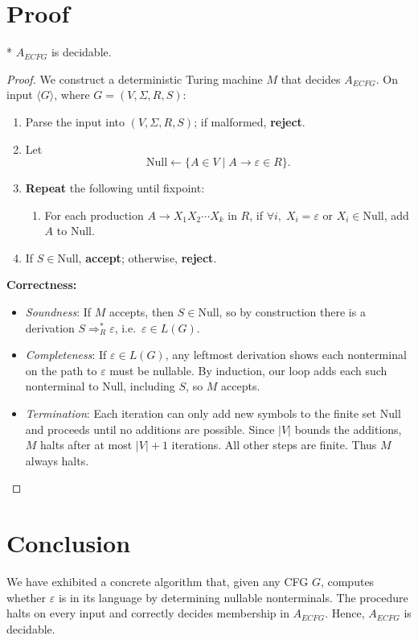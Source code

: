\documentclass[12pt]{article}
\begin{document}
	\section*{Proof}
	*	$A_{ECFG}$ is decidable.
	\begin{proof}
		We construct a deterministic Turing machine $M$ that decides $A_{ECFG}$.  On input $\langle G\rangle$, where $G=(V,\Sigma,R,S)$:
		\begin{enumerate}[label=\arabic*.]
			\item Parse the input into $(V,\Sigma,R,S)$; if malformed, \textbf{reject}.
			\item Let
			\[
			\mathrm{Null} \leftarrow \{A\in V \mid A\to\varepsilon\in R\}.
			\]
			\item \textbf{Repeat} the following until fixpoint:
			\begin{enumerate}[label=\alph*.]
				\item For each production $A\to X_1X_2\cdots X_k$ in $R$, if $\forall i,\;X_i=\varepsilon$ or $X_i\in\mathrm{Null}$, add $A$ to $\mathrm{Null}$.
			\end{enumerate}
			\item If $S\in\mathrm{Null}$, \textbf{accept}; otherwise, \textbf{reject}.
		\end{enumerate}
		
		\textbf{Correctness:}
		\begin{itemize}
			\item \emph{Soundness}: If $M$ accepts, then $S\in\mathrm{Null}$, so by construction there is a derivation $S\Rightarrow^*_R\varepsilon$, i.e.\ $\varepsilon\in L(G)$.
			\item \emph{Completeness}: If $\varepsilon\in L(G)$, any leftmost derivation shows each nonterminal on the path to $\varepsilon$ must be nullable.  By induction, our loop adds each such nonterminal to $\mathrm{Null}$, including $S$, so $M$ accepts.
			\item \emph{Termination}: Each iteration can only add new symbols to the finite set $\mathrm{Null}$ and proceeds until no additions are possible.  Since $|V|$ bounds the additions, $M$ halts after at most $|V|+1$ iterations.  All other steps are finite.  Thus $M$ always halts.
		\end{itemize}
	\end{proof}
	
	\section*{Conclusion}
	We have exhibited a concrete algorithm that, given any CFG $G$, computes whether $\varepsilon$ is in its language by determining nullable nonterminals.  The procedure halts on every input and correctly decides membership in $A_{ECFG}$.  Hence, $A_{ECFG}$ is decidable.
	
\end{document}
